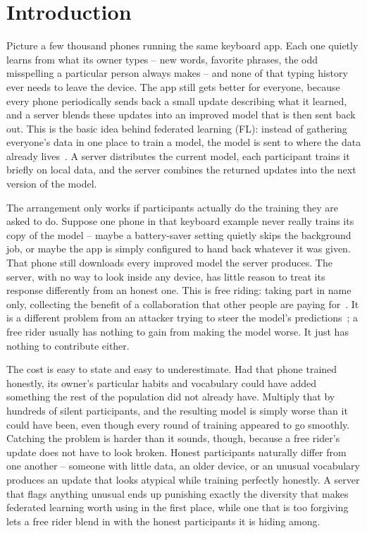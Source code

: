 \documentclass[conference]{IEEEtran}
\begin{document}
\section{Introduction}

Picture a few thousand phones running the same keyboard app. Each one quietly
learns from what its owner types -- new words, favorite phrases, the odd
misspelling a particular person always makes -- and none of that typing
history ever needs to leave the device. The app still gets better for
everyone, because every phone periodically sends back a small update
describing what it learned, and a server blends these updates into an
improved model that is then sent back out. This is the basic idea behind
federated learning (FL): instead of gathering everyone's data in one place to
train a model, the model is sent to where the data already
lives~\cite{mcmahan2017communication}. A server distributes the current
model, each participant trains it briefly on local data, and the server
combines the returned updates into the next version of the model.

The arrangement only works if participants actually do the training they are
asked to do. Suppose one phone in that keyboard example never really trains
its copy of the model -- maybe a battery-saver setting quietly skips the
background job, or maybe the app is simply configured to hand back whatever
it was given. That phone still downloads every improved model the server
produces. The server, with no way to look inside any device, has little
reason to treat its response differently from an honest one. This is free
riding: taking part in name only, collecting the benefit of a collaboration
that other people are paying for~\cite{lin2019freeriders,fraboni2021freerider}.
It is a different problem from an attacker trying to steer the model's
predictions~\cite{bagdasaryan2020backdoor}; a free rider usually has nothing
to gain from making the model worse. It just has nothing to contribute either.

The cost is easy to state and easy to underestimate. Had that phone trained
honestly, its owner's particular habits and vocabulary could have added
something the rest of the population did not already have. Multiply that by
hundreds of silent participants, and the resulting model is simply worse than
it could have been, even though every round of training appeared to go
smoothly. Catching the problem is harder than it sounds, though, because a
free rider's update does not have to look broken. Honest participants
naturally differ from one another -- someone with little data, an older
device, or an unusual vocabulary produces an update that looks atypical while
training perfectly honestly. A server that flags anything unusual ends up
punishing exactly the diversity that makes federated learning worth using in
the first place, while one that is too forgiving lets a free rider blend in
with the honest participants it is hiding among.
\end{document}
